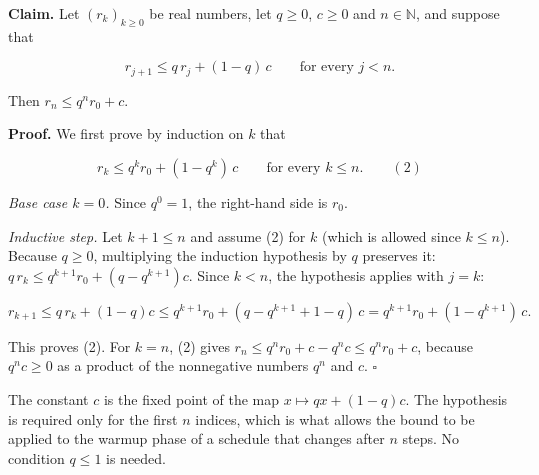 \documentclass[11pt,a4paper]{article}
\begin{document}
\textbf{Claim.} Let \((r_k)_{k\ge0}\) be real numbers, let \(q\ge0\), \(c\ge0\) and \(n\in\mathbb N\), and suppose that


\[r_{j+1}\le q\,r_j+(1-q)\,c\qquad\text{for every }j<n.\]


Then \(r_n\le q^nr_0+c\).




\textbf{Proof.} We first prove by induction on \(k\) that


\[r_k\le q^kr_0+(1-q^k)\,c\qquad\text{for every }k\le n.\qquad(2)\]


\emph{Base case \(k=0\).} Since \(q^0=1\), the right-hand side is \(r_0\).




\emph{Inductive step.} Let \(k+1\le n\) and assume (2) for \(k\) (which is allowed since \(k\le n\)). Because \(q\ge0\), multiplying the induction hypothesis by \(q\) preserves it: \(q\,r_k\le q^{k+1}r_0+(q-q^{k+1})c\). Since \(k<n\), the hypothesis applies with \(j=k\):


\[r_{k+1}\le q\,r_k+(1-q)c\le q^{k+1}r_0+(q-q^{k+1}+1-q)\,c=q^{k+1}r_0+(1-q^{k+1})\,c.\]


This proves (2). For \(k=n\), (2) gives \(r_n\le q^nr_0+c-q^nc\le q^nr_0+c\), because \(q^nc\ge0\) as a product of the nonnegative numbers \(q^n\) and \(c\). \(\square\)




The constant \(c\) is the fixed point of the map \(x\mapsto qx+(1-q)c\). The hypothesis is required only for the first \(n\) indices, which is what allows the bound to be applied to the warmup phase of a schedule that changes after \(n\) steps. No condition \(q\le1\) is needed.
\end{document}
